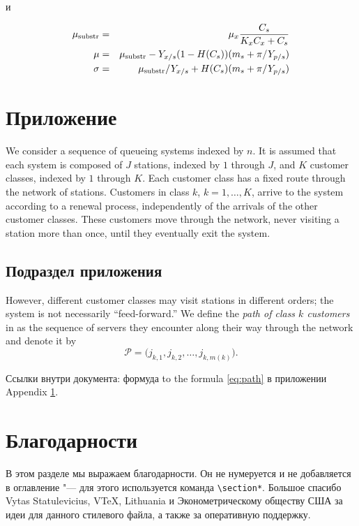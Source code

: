 \documentclass[final,pdftex]{epsilonj}
\numberwithin{equation}{section}
\begin{document}
и

\begin{eqnarray}
 \mu_{\rm substr} & = & \mu_{x} \frac{C_{s}}{K_{x}C_{x}+C_{s}}  \\
 \mu              & = & \mu_{\rm substr} - Y_{x/s}(1-H(C_{s}))(m_{s}+\pi /Y_{p/s}) \\
 \sigma           & = & \mu_{\rm substr}/Y_{x/s}+ H(C_{s}) (m_{s}+ \pi /Y_{p/s})
\end{eqnarray}

\printbibliography

\appendix

\section{Приложение}
\label{pril}

We consider a sequence of queueing systems
indexed by $n$.  It is assumed that each system
is composed of $J$ stations, indexed by $1$
through $J$, and $K$ customer classes, indexed
by $1$ through $K$.  Each customer class
has a fixed route through the network of
stations.  Customers in class
$k$, $k=1,\ldots,K$, arrive to the
system according to a
renewal process, independently of the arrivals
of the other customer classes.  These customers
move through the network, never visiting a station
more than once, until they eventually exit
the system.


\subsection{Подраздел приложения}

However, different customer classes may visit
stations in different orders; the system
is not necessarily ``feed-forward.''
We define the {\em path of class $k$ customers} in
as the sequence of servers
they encounter along their way through the network
and denote it by
\begin{equation}
\mathcal{P}=\bigl(j_{k,1},j_{k,2},\dots,j_{k,m(k)}\bigr). \label{eq:path}
\end{equation}

Ссылки внутри документа: формуда to the formula \ref{eq:path} в приложении Appendix \ref{pril}.

\section*{Благодарности}
В этом разделе мы выражаем благодарности. Он не нумеруется и не добавляется в оглавление "--- для этого используется команда \verb"\section*". Большое спасибо Vytas Statulevicius, VTeX, Lithuania и Эконометрическому обществу США за идеи для данного стилевого файла, а также за оперативную поддержку.
\end{document}
